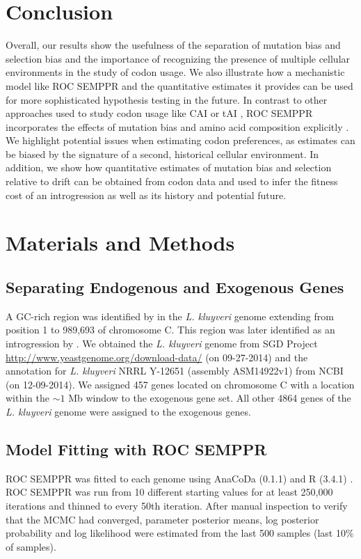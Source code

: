 \documentclass[doublespacing,linenumbers]{bmcart}
\newcommand{\kluyveri}{\textit{L. kluyveri}\xspace}
\newcommand{\ROC}{ROC SEMPPR\xspace}
\begin{document}
\section*{Conclusion}
Overall, our results show the usefulness of the separation of mutation bias and selection bias and the importance of recognizing the presence of multiple cellular environments in the study of codon usage.
We also illustrate how a mechanistic model like \ROC and the quantitative estimates it provides can be used for more sophisticated hypothesis testing in the future.
In contrast to other approaches used to study codon usage like CAI \citep{sharp1987} or tAI \citep{dosreis2004}, \ROC incorporates the effects of mutation bias and amino acid composition explicitly \citep{cope2018}.
We highlight potential issues when estimating codon preferences, as estimates can be biased by the signature of a second, historical cellular environment.
In addition, we show how quantitative estimates of mutation bias and selection relative to drift can be obtained from codon data and used to infer the fitness cost of an introgression as well as its history and potential future.

\section*{Materials and Methods}

\subsection*{Separating Endogenous and Exogenous Genes}
A GC-rich region was identified by \cite{payen2009} in the \kluyveri genome extending from position 1 to 989,693 of chromosome C.
This region was later identified as an introgression by \cite{friedrich2015}.
We obtained the \kluyveri genome from SGD Project \url{http://www.yeastgenome.org/download-data/} (on 09-27-2014) and the annotation for \kluyveri NRRL Y-12651 (assembly ASM14922v1) from NCBI (on 12-09-2014).
We assigned 457 genes located on chromosome C with a location within the $\sim 1$ Mb window to the exogenous gene set.
All other 4864 genes of the \kluyveri genome were assigned to the exogenous genes.

\subsection*{Model Fitting with \ROC}
\ROC was fitted to each genome using AnaCoDa (0.1.1) \citep{landerer2018} and R (3.4.1) \citep{rcore}.
\ROC was run from 10 different starting values for at least 250,000 iterations and thinned to every 50th iteration.
After manual inspection to verify that the MCMC had converged, parameter posterior means, log posterior probability and log likelihood were estimated from the last 500 samples (last 10\% of samples).
\end{document}
